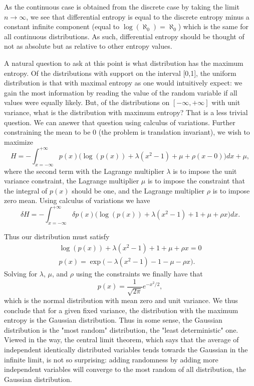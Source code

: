\documentclass[]{article}
\begin{document}
As the continuous case is obtained from the discrete case by taking the limit $n\rightarrow \infty$, we see that differential entropy is equal to the discrete entropy minus a constant infinite component (equal to $\log(\aleph_0) = \aleph_0$) which is the same for all continuous distributions. As such, differential entropy should be thought of not as absolute but as relative to other entropy values. 

A natural question to ask at this point is what distribution has the maximum entropy. Of the distributions with support on the interval [0,1], the uniform distribution is that with maximal entropy as one would intuitively expect: we gain the most information by reading the value of the random variable if all values were equally likely.  But, of the distributions on $[-\infty, +\infty]$ with unit variance, what is the distribution with maximum entropy? That is a less trivial question. We can answer that question using calculus of variations. Further constraining the mean to be 0 (the problem is translation invariant), we wish to maximize 
\begin{equation}
\label{eq:maxentfct}
H =  -\int_{x=-\infty}^{+\infty} p(x) \big(\log(p(x)) +\lambda(x^2-1) +\mu + \rho (x-0)\big) dx  +\mu,
\end{equation}
where the second term with the Lagrange multiplier $\lambda$ is to impose the unit variance constraint, the Lagrange multiplier $\mu$ is to impose the constraint that the integral of $p(x)$ should be one, and the Lagrange multiplier $\rho$ is to impose zero mean. Using calculus of variations we have 
\begin{equation}
\label{eq:dmaxentfct}
\delta H =  -\int_{x=-\infty}^{+\infty} \delta p(x) \big(\log(p(x)) +\lambda(x^2-1) +1 +\mu + \rho x\big)  dx .
\end{equation}

Thus our distribution must satisfy
\begin{align}
\label{eq:maxentsol}
\log(p(x)) +\lambda(x^2-1) +1 +\mu +\rho x = 0 \\
p(x) = \exp\big(-\lambda(x^2-1) -1 -\mu -\rho x\big).
\end{align}
Solving for $\lambda$, $\mu$, and $\rho$ using the constraints we finally have that
\begin{equation}
\label{eq:maxentsol2}
p(x) = \frac{1}{\sqrt{2\pi}}e^{-x^2/2} ,
\end{equation}
which is the normal distribution with mean zero and unit variance. We thus conclude that for a given fixed variance, the distribution with the maximum entropy is the Gaussian distribution. Thus in some sense, the Gaussian distribution is the "most random" distribution, the "least deterministic" one. Viewed in the way, the central limit theorem, which says that the average of independent identically distributed variables tends towards the Gaussian in the infinite limit, is not so surprising: adding randomness by adding more independent variables will converge to the most random of all distribution, the Gaussian distribution. 
\end{document}

